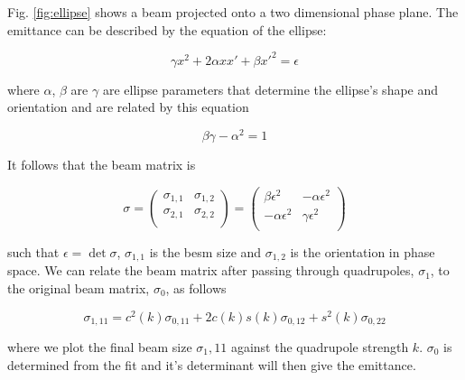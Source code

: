Fig. \ref{fig:ellipse} shows a beam projected onto a two dimensional phase
plane. The emittance can be described by the equation of the ellipse:

\[ \gamma x^2 + 2\alpha xx' + \beta x'^2 = \epsilon \]

where \(\alpha\),  \(\beta\) are \(\gamma\) are ellipse parameters that
determine the ellipse's shape and orientation and are related by this equation

\[ \beta\gamma - \alpha^2 = 1 \]



It follows that the beam matrix is

\[\sigma =
	\begin{pmatrix}
	  \sigma_{1,1} & \sigma_{1,2} \\
	  \sigma_{2,1} & \sigma_{2,2} \\
	\end{pmatrix}
	=
	\begin{pmatrix}
	  \beta\epsilon^2 & -\alpha\epsilon^2 \\
	  -\alpha\epsilon^2 & \gamma\epsilon^2 \\
	\end{pmatrix}
\]

such that \(\epsilon = \det\sigma\), \(\sigma_{1,1}\) is the besm size and
\(\sigma_{1,2}\) is the orientation in phase space. We can relate the beam
matrix after passing through quadrupoles, \(\sigma_1\), to the original beam
matrix, \(\sigma_0\), as follows

\[
	\sigma_{1,11} = c^2(k)\sigma_{0,11} + 2c(k)s(k)\sigma_{0,12} +
	s^2(k)\sigma_{0,22}
\]

where we plot the final beam size \(\sigma_1,11\) against the quadrupole
strength \(k\).  \(\sigma_0\) is determined from the fit and it's determinant
will then give the emittance.

